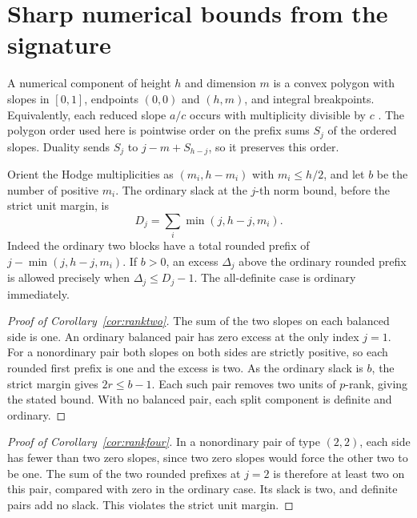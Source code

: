 \section{Sharp numerical bounds from the signature}\label{sec:numerical}

A numerical component of height \(h\) and dimension \(m\) is
a convex polygon with slopes in \([0,1]\), endpoints \((0,0)\)
and \((h,m)\), and integral breakpoints. Equivalently, each
reduced slope \(a/c\) occurs with multiplicity divisible by \(c\)
\cite[\S1.1]{oort}. The polygon order used here is pointwise order
on the prefix sums \(S_j\) of the ordered slopes. Duality sends
\(S_j\) to \(j-m+S_{h-j}\), so it preserves this order.

Orient the Hodge multiplicities as \((m_i,h-m_i)\) with
\(m_i\le h/2\), and let \(b\) be the number of positive \(m_i\).
The ordinary slack at the \(j\)-th norm bound, before the strict
unit margin, is
\begin{equation}\label{eq:ordinary-slack}
 D_j=\sum_i\min(j,h-j,m_i).
\end{equation}
Indeed the ordinary two blocks have a total rounded prefix of
\(j-\min(j,h-j,m_i)\). If \(b>0\), an excess \(\Delta_j\) above
the ordinary rounded prefix is allowed precisely when
\(\Delta_j\le D_j-1\). The all-definite case is ordinary immediately.

\begin{proof}[Proof of Corollary~\ref{cor:ranktwo}]
The sum of the two slopes on each balanced side is one.
An ordinary balanced pair has zero excess at the only index
\(j=1\). For a nonordinary pair both slopes on both sides are
strictly positive, so each rounded first prefix is one and the
excess is two. As the ordinary slack is \(b\), the strict margin
gives \(2r\le b-1\). Each such pair removes two units of
\(p\)-rank, giving the stated bound. With no balanced pair,
each split component is definite and ordinary.
\end{proof}

\begin{proof}[Proof of Corollary~\ref{cor:rankfour}]
In a nonordinary pair of type \((2,2)\), each side has fewer than
two zero slopes, since two zero slopes would force the other
two to be one. The sum of the two rounded prefixes at \(j=2\)
is therefore at least two on this pair, compared with zero in
the ordinary case. Its slack is two, and definite pairs add
no slack. This violates the strict unit margin.
\end{proof}

